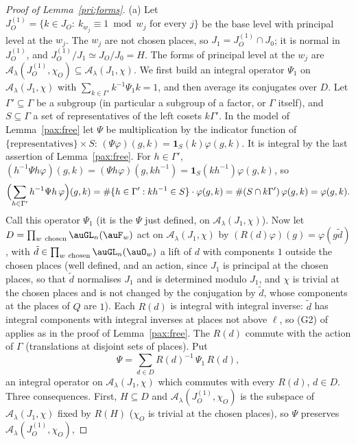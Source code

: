 \documentclass[10pt]{amsart}
\theoremstyle{definition}
\theoremstyle{remark}
\begin{document}
\begin{proof}[Proof of Lemma~\ref{pri:forms}]
(a) Let $J_O^{(1)}=\{k\in J_O:\ k_{w_j}\equiv1\bmod w_j\text{ for every }j\}$ be the base level with principal
level at the $w_j$. The $w_j$ are not chosen places, so $J_1=J_O^{(1)}\cap J_0$; it is normal in $J_O^{(1)}$, and
$J_O^{(1)}/J_1\simeq J_O/J_0=H$. The forms of
principal level at the $w_j$ are $\mathcal A_\lambda(J_O^{(1)},\chi_O)\subseteq\mathcal A_\lambda(J_1,\chi)$.
We first build an integral operator $\Psi_1$ on $\mathcal A_\lambda(J_1,\chi)$ with $\sum_{k\in\Gamma'}
k^{-1}\Psi_1k=1$, and then average its conjugates over $D$. Let $\Gamma'\subseteq\Gamma$
be a subgroup (in particular a subgroup of a factor, or $\Gamma$ itself), and $S\subseteq\Gamma$ a set
of representatives of the left cosets $k\Gamma'$. In the model of Lemma~\ref{pax:free} let $\Psi$ be
multiplication by the indicator function of $\{\text{representatives}\}\times S$:
$(\Psi\varphi)(g,k)=\mathbf 1_S(k)\varphi(g,k)$. It is integral by the last assertion of
Lemma~\ref{pax:free}. For $h\in\Gamma'$, $(h^{-1}\Psi h\varphi)(g,k)=(\Psi h\varphi)(g,kh^{-1})=
\mathbf 1_S(kh^{-1})\varphi(g,k)$, so
\[
\Bigl(\sum_{h\in\Gamma'}h^{-1}\Psi h\,\varphi\Bigr)(g,k)=\#\{h\in\Gamma':kh^{-1}\in S\}\cdot
\varphi(g,k)=\#(S\cap k\Gamma')\,\varphi(g,k)=\varphi(g,k).
\]
Call this operator $\Psi_1$ (it is the $\Psi$ just defined, on $\mathcal A_\lambda(J_1,\chi)$). Now let
$D=\prod_{w\ \mathrm{chosen}}\auGL_n(\auF_w)$ act on $\mathcal A_\lambda(J_1,\chi)$ by
$(R(d)\varphi)(g)=\varphi(g\tilde d)$, with $\tilde d\in\prod_{w\ \mathrm{chosen}}\auGL_n(\auO_w)$ a lift
of $d$ with components $1$ outside the chosen places (well defined, and an action, since $J_1$ is principal at the chosen
places, so that $\tilde d$ normalises $J_1$ and is determined modulo $J_1$, and $\chi$ is trivial at the chosen places and
is not changed by the conjugation by $\tilde d$, whose components at the places of $Q$ are $1$). Each $R(d)$ is integral with integral inverse:
$\tilde d$ has integral components with integral inverses at places not above $\ell$, so (G2) of
{\cite[\S6.1]{P49}} applies as in the proof of Lemma~\ref{pax:free}. The $R(d)$ commute with the
action of $\Gamma$ (translations at disjoint sets of places). Put
\[
\Psi=\sum_{d\in D}R(d)^{-1}\,\Psi_1\,R(d),
\]
an integral operator on $\mathcal A_\lambda(J_1,\chi)$ which commutes with every $R(d)$, $d\in D$. Three consequences.
First, $H\subseteq D$ and $\mathcal A_\lambda(J_O^{(1)},\chi_O)$ is the subspace of $\mathcal A_\lambda(J_1,\chi)$
fixed by $R(H)$ ($\chi_O$ is trivial at the chosen places), so $\Psi$ preserves $\mathcal A_\lambda(J_O^{(1)},\chi_O)$,

\end{proof}
\end{document}
